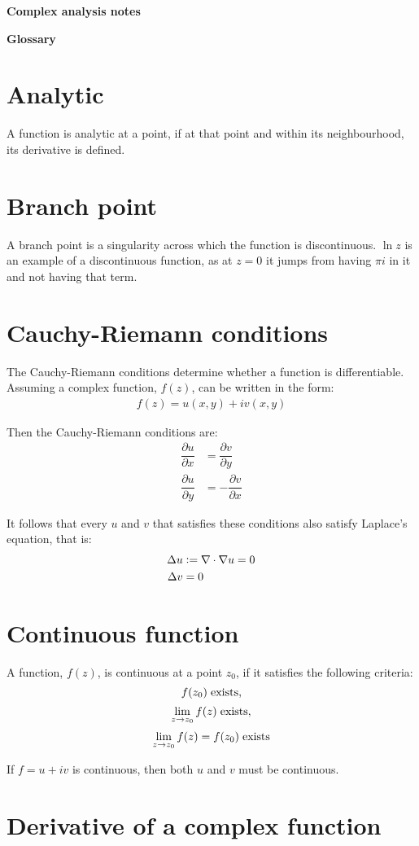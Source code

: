 \documentclass[12pt,a4paper]{article}
\newcommand{\labsec}[1]{\section{#1}
	\label{sec:#1}}
\newcommand{\defeq}{\vcentcolon=}
\begin{document}
	{\Huge \textbf{Complex analysis notes}}
	
	\tableofcontents
	\newpage
	
	{\LARGE \textbf{Glossary}}
	
	\labsec{Analytic}
	
	A function is analytic at a point, if at that point and within its neighbourhood, its derivative is defined.
	
	\labsec{Branch point}
	
	A branch point is a singularity across which the function is discontinuous. $\ln{z}$ is an example of a discontinuous function, as at $z=0$ it jumps from having $\pi i$ in it and not having that term.
	
	\labsec{Cauchy-Riemann conditions}
	
	The Cauchy-Riemann conditions determine whether a function is differentiable. Assuming a complex function, $f(z)$, can be written in the form:
	\begin{align*}
		f(z) = u(x,y) + iv(x,y)
	\end{align*}

	Then the Cauchy-Riemann conditions are:
	\begin{align*}
		\dfrac{\partial u}{\partial x} &= \dfrac{\partial v}{\partial y} \\
		\dfrac{\partial u}{\partial y} &= - \dfrac{\partial v}{\partial x}
	\end{align*}

	It follows that every $u$ and $v$ that satisfies these conditions also satisfy Laplace's equation, that is:
	\begin{align*}
	\Delta u &\defeq \nabla \cdot \nabla u = 0 \\
	\Delta v &= 0
	\end{align*}

	\labsec{Continuous function}
	
	A function, $f(z)$, is continuous at a point $z_0$, if it satisfies the following criteria:
	\[
		f(z_0) \hspace{0.1cm}\mathrm{exists,}
	\]
	\[
		\lim_{z\rightarrow z_0} f(z) \hspace{0.1cm}\mathrm{exists,}
	\]
	\[
		\lim_{z\rightarrow z_0} f(z) = f(z_0)
		\hspace{0.1cm}\mathrm{exists}
	\]
	
	If $f = u + iv$ is continuous, then both $u$ and $v$ must be continuous.

	\labsec{Derivative of a complex function}
	
\end{document}
